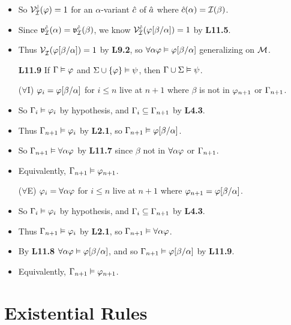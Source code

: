 \documentclass[a4paper, 11pt]{article} %
\begin{document}
\begin{itemize}
    \item So $\mathcal{V}_{\mathcal{I}}^{\hat{c}}(\varphi)=1$ for an $\alpha$-variant $\hat{c}$ of $\hat{a}$ where $\hat{c}(\alpha)=\mathcal{I}(\beta)$.
    \item Since $\mathfrak{v}_{\mathcal{I}}^{\hat{c}}(\alpha)=\mathfrak{v}_{\mathcal{I}}^{\hat{c}}(\beta)$, we know $\mathcal{V}_{\mathcal{I}}^{\hat{c}}(\varphi[\beta/\alpha])=1$ by \textbf{L11.5}.
    \item Thus $\mathcal{V}_{\mathcal{I}}^{}(\varphi[\beta/\alpha])=1$ by \textbf{L9.2}, so $\forall\alpha\varphi \vDash \varphi[\beta/\alpha]$ generalizing on $\mathcal{M}$.
  \item[\bf L11.9] If $\Gamma \vDash \varphi$ and $\Sigma \cup \lbrace\varphi\rbrace \vDash \psi$, then $\Gamma\cup\Sigma \vDash \psi$.
  \item[($\forall$I)] $\varphi_i=\varphi[\beta/\alpha]$ for $i\leq n$ live at $n+1$ where $\beta$ is not in $\varphi_{n+1}$ or $\Gamma_{n+1}$.
    \item So $\Gamma_i\vDash\varphi_i$ by hypothesis, and $\Gamma_i\subseteq\Gamma_{n+1}$ by \textbf{L4.3}.
    \item Thus $\Gamma_{n+1}\vDash\varphi_i$ by \textbf{L2.1}, so $\Gamma_{n+1}\vDash\varphi[\beta/\alpha]$.
    \item So $\Gamma_{n+1}\vDash \forall \alpha\varphi$ by \textbf{L11.7} since $\beta$ not in $\forall \alpha\varphi$ or $\Gamma_{n+1}$.
    \item Equivalently, $\Gamma_{n+1}\vDash \varphi_{n+1}$.
  \item[($\forall$E)] $\varphi_i=\forall \alpha\varphi$ for $i\leq n$ live at $n+1$ where $\varphi_{n+1}=\varphi[\beta/\alpha]$.
    \item So $\Gamma_i\vDash\varphi_i$ by hypothesis, and $\Gamma_i\subseteq\Gamma_{n+1}$ by \textbf{L4.3}.
    \item Thus $\Gamma_{n+1}\vDash\varphi_i$ by \textbf{L2.1}, so $\Gamma_{n+1}\vDash \forall \alpha\varphi$.
    \item By \textbf{L11.8} $\forall \alpha\varphi\vDash\varphi[\beta/\alpha]$, and so $\Gamma_{n+1}\vDash\varphi[\beta/\alpha]$ by \textbf{L11.9}.
    \item Equivalently, $\Gamma_{n+1}\vDash \varphi_{n+1}$.
\end{itemize}




\section*{Existential Rules}
\end{document}
